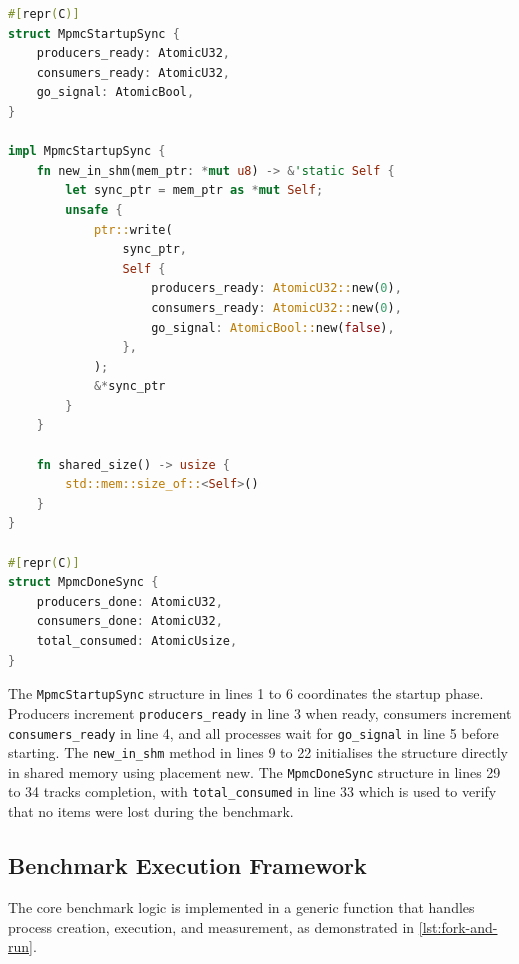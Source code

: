 \begin{lstlisting}[language=Rust, style=boxed, caption={Process synchronisation structures}, label={lst:sync-structures}]
#[repr(C)]
struct MpmcStartupSync {
    producers_ready: AtomicU32,
    consumers_ready: AtomicU32,
    go_signal: AtomicBool,
}

impl MpmcStartupSync {
    fn new_in_shm(mem_ptr: *mut u8) -> &'static Self {
        let sync_ptr = mem_ptr as *mut Self;
        unsafe {
            ptr::write(
                sync_ptr,
                Self {
                    producers_ready: AtomicU32::new(0),
                    consumers_ready: AtomicU32::new(0),
                    go_signal: AtomicBool::new(false),
                },
            );
            &*sync_ptr
        }
    }

    fn shared_size() -> usize {
        std::mem::size_of::<Self>()
    }
}

#[repr(C)]
struct MpmcDoneSync {
    producers_done: AtomicU32,
    consumers_done: AtomicU32,
    total_consumed: AtomicUsize,
}
\end{lstlisting}

The \texttt{MpmcStartupSync} structure in lines 1 to 6 coordinates the startup phase. Producers increment \texttt{producers\_ready} in line 3 when ready, consumers increment \texttt{consumers\_ready} in line 4, and all processes wait for \texttt{go\_signal} in line 5 before starting. The \texttt{new\_in\_shm} method in lines 9 to 22 initialises the structure directly in shared memory using placement new. The \texttt{MpmcDoneSync} structure in lines 29 to 34 tracks completion, with \texttt{total\_consumed} in line 33 which is used to verify that no items were lost during the benchmark.

\subsection{Benchmark Execution Framework}

The core benchmark logic is implemented in a generic function that handles process creation, execution, and measurement, as demonstrated in \cref{lst:fork-and-run}.

